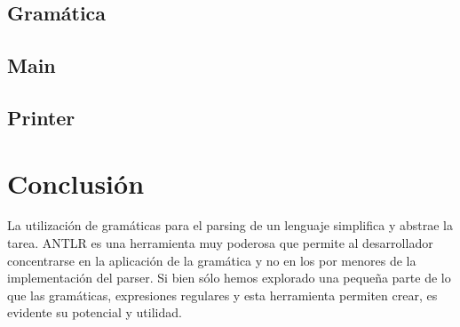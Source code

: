 \documentclass[11pt, a4paper, spanish]{article}
\begin{document}
\subsection{Gram\'atica}

\newpage
\subsection{Main}

\newpage
\subsection{Printer}

\newpage

\section{Conclusi\'on}
\indent La utilizaci\'on de gram\'aticas para el parsing de un lenguaje simplifica y abstrae la tarea. ANTLR es una herramienta muy poderosa que permite al desarrollador concentrarse en la aplicaci\'on de la gram\'atica y no en los por menores de la implementaci\'on del parser. Si bien s\'olo hemos explorado una peque\~na parte de lo que las gram\'aticas, expresiones regulares y esta herramienta permiten crear, es evidente su potencial y utilidad.
\end{document}
